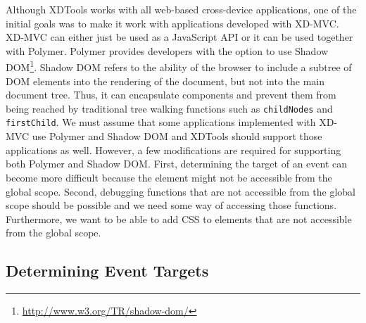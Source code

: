 Although XDTools works with all web-based cross-device applications, one of the initial goals was to make it work with applications developed with XD-MVC. XD-MVC can either just be used as a JavaScript API or it can be used together with Polymer. Polymer provides developers with the option to use Shadow DOM\footnote{\url{http://www.w3.org/TR/shadow-dom/}}. Shadow DOM refers to the ability of the browser to include a subtree of DOM elements into the rendering of the document, but not into the main document tree. Thus, it can encapsulate components and prevent them from being reached by traditional tree walking functions such as \lstinline|childNodes| and \lstinline|firstChild|. We must assume that some applications implemented with XD-MVC use Polymer and Shadow DOM and XDTools should support those applications as well. However, a few modifications are required for supporting both Polymer and Shadow DOM. First, determining the target of an event can become more difficult because the element might not be accessible from the global scope. Second, debugging functions that are not accessible from the global scope should be possible and we need some way of accessing those functions. Furthermore, we want to be able to add CSS to elements that are not accessible from the global scope.

\subsection{Determining Event Targets}

